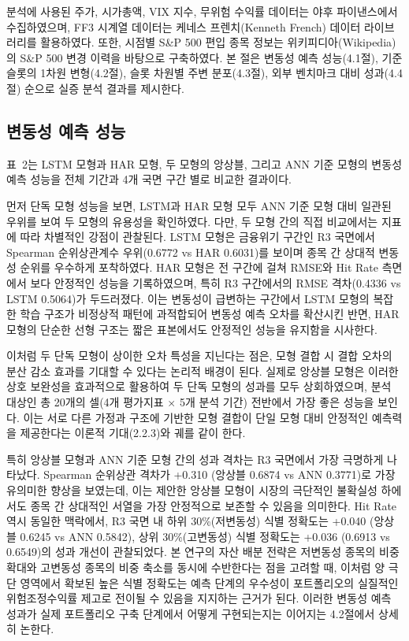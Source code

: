 \documentclass{article}
\begin{document}
분석에 사용된 주가, 시가총액, VIX 지수, 무위험 수익률 데이터는 야후 파이낸스에서 수집하였으며, FF3 시계열 데이터는 케네스 프렌치(Kenneth French) 데이터 라이브러리를 활용하였다. 또한, 시점별 S\&P 500 편입 종목 정보는 위키피디아(Wikipedia)의 S\&P 500 변경 이력을 바탕으로 구축하였다. 본 절은 변동성 예측 성능(4.1절), 기준 슬롯의 1차원 변형(4.2절), 슬롯 차원별 주변 분포(4.3절), 외부 벤치마크 대비 성과(4.4절) 순으로 실증 분석 결과를 제시한다.

\subsection{변동성 예측 성능}\label{subsec:vol_pred_eval}

표~2는 LSTM 모형과 HAR 모형, 두 모형의 앙상블, 그리고 ANN 기준 모형의 변동성 예측 성능을 전체 기간과 4개 국면 구간 별로 비교한 결과이다.

먼저 단독 모형 성능을 보면, LSTM과 HAR 모형 모두 ANN 기준 모형 대비 일관된 우위를 보여 두 모형의 유용성을 확인하였다. 다만, 두 모형 간의 직접 비교에서는 지표에 따라 차별적인 강점이 관찰된다. LSTM 모형은 금융위기 구간인 R3 국면에서 Spearman 순위상관계수 우위(0.6772 vs HAR 0.6031)를 보이며 종목 간 상대적 변동성 순위를 우수하게 포착하였다. HAR 모형은 전 구간에 걸쳐 RMSE와 Hit Rate 측면에서 보다 안정적인 성능을 기록하였으며, 특히 R3 구간에서의 RMSE 격차(0.4336 vs LSTM 0.5064)가 두드러졌다. 이는 변동성이 급변하는 구간에서 LSTM 모형의 복잡한 학습 구조가 비정상적 패턴에 과적합되어 변동성 예측 오차를 확산시킨 반면, HAR 모형의 단순한 선형 구조는 짧은 표본에서도 안정적인 성능을 유지함을 시사한다. 

이처럼 두 단독 모형이 상이한 오차 특성을 지닌다는 점은, 모형 결합 시 결합 오차의 분산 감소 효과를 기대할 수 있다는 논리적 배경이 된다. 실제로 앙상블 모형은 이러한 상호 보완성을 효과적으로 활용하여 두 단독 모형의 성과를 모두 상회하였으며, 분석 대상인 총 20개의 셀(4개 평가지표 $\times$ 5개 분석 기간) 전반에서 가장 좋은 성능을 보인다. 이는 서로 다른 가정과 구조에 기반한 모형 결합이 단일 모형 대비 안정적인 예측력을 제공한다는 이론적 기대(2.2.3)와 궤를 같이 한다.

특히 앙상블 모형과 ANN 기준 모형 간의 성과 격차는 R3 국면에서 가장 극명하게 나타났다. Spearman 순위상관 격차가 +0.310 (앙상블 0.6874 vs ANN 0.3771)로 가장 유의미한 향상을 보였는데, 이는 제안한 앙상블 모형이 시장의 극단적인 불확실성 하에서도 종목 간 상대적인 서열을 가장 안정적으로 보존할 수 있음을 의미한다. Hit Rate 역시 동일한 맥락에서, R3 국면 내 하위 30\%(저변동성) 식별 정확도는 +0.040 (앙상블 0.6245 vs ANN 0.5842), 상위 30\%(고변동성) 식별 정확도는 +0.036 (0.6913 vs 0.6549)의 성과 개선이 관찰되었다. 본 연구의 자산 배분 전략은 저변동성 종목의 비중 확대와 고변동성 종목의 비중 축소를 동시에 수반한다는 점을 고려할 때, 이처럼 양 극단 영역에서 확보된 높은 식별 정확도는 예측 단계의 우수성이 포트폴리오의 실질적인 위험조정수익률 제고로 전이될 수 있음을 지지하는 근거가 된다. 이러한 변동성 예측 성과가 실제 포트폴리오 구축 단계에서 어떻게 구현되는지는 이어지는 4.2절에서 상세히 논한다.
\end{document}
